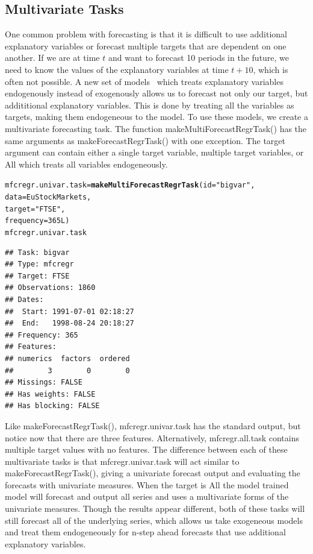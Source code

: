 \documentclass[12pt]{article}\usepackage[]{graphicx}\usepackage[]{color}
\makeatletter
\newcommand{\hlnum}[1]{\textcolor[rgb]{0.686,0.059,0.569}{#1}}%
\newcommand{\hlstr}[1]{\textcolor[rgb]{0.192,0.494,0.8}{#1}}%
\newcommand{\hlstd}[1]{\textcolor[rgb]{0.345,0.345,0.345}{#1}}%
\newcommand{\hlkwb}[1]{\textcolor[rgb]{0.69,0.353,0.396}{#1}}%
\newcommand{\hlkwc}[1]{\textcolor[rgb]{0.333,0.667,0.333}{#1}}%
\newcommand{\hlkwd}[1]{\textcolor[rgb]{0.737,0.353,0.396}{\textbf{#1}}}%
\newenvironment{kframe}{%
 \def\at@end@of@kframe{}%
 \ifinner\ifhmode%
  \def\at@end@of@kframe{\end{minipage}}%
  \begin{minipage}{\columnwidth}%
 \fi\fi%
 \def\FrameCommand##1{\hskip\@totalleftmargin \hskip-\fboxsep
 \colorbox{shadecolor}{##1}\hskip-\fboxsep
     \hskip-\linewidth \hskip-\@totalleftmargin \hskip\columnwidth}%
 \MakeFramed {\advance\hsize-\width
   \@totalleftmargin\z@ \linewidth\hsize
   \@setminipage}}%
 {\par\unskip\endMakeFramed%
 \at@end@of@kframe}
\newenvironment{knitrout}{}{} %
\theoremstyle{definition}
\newcommand\code{\@codex}
\def\@codex#1{{\normalfont\ttfamily\hyphenchar\font=-1 #1}}
\makeatother
\begin{document}
\subsection{Multivariate Tasks}
\label{sec:multivarTask}
One common problem with forecasting is that it is difficult to use additional explanatory variables or forecast multiple targets that are dependent on one another. If we are at time $t$ and want to forecast 10 periods in the future, we need to know the values of the explanatory variables at time $t+10$, which is often not possible. A new set of models~\cite{BigVAR} which treats explanatory variables endogenously instead of exogenously allows us to forecast not only our target, but addititional explanatory variables. This is done by treating all the variables as targets, making them endogeneous to the model. To use these models, we create a multivariate forecasting task. The function \code{makeMultiForecastRegrTask()} has the same arguments as \code{makeForecastRegrTask()} with one exception. The \code{target} argument can contain either a single target variable, multiple target variables, or \code{All} which treats all variables endogeneously.
\singlespacing
\begin{knitrout}
\color{fgcolor}\begin{kframe}
\begin{alltt}
\hlstd{mfcregr.univar.task} \hlkwb{=} \hlkwd{makeMultiForecastRegrTask}\hlstd{(}\hlkwc{id} \hlstd{=} \hlstr{"bigvar"}\hlstd{,}
                                                \hlkwc{data} \hlstd{= EuStockMarkets,}
                                                \hlkwc{target} \hlstd{=} \hlstr{"FTSE"}\hlstd{,}
                                                \hlkwc{frequency} \hlstd{=} \hlnum{365L}\hlstd{)}
\hlstd{mfcregr.univar.task}
\end{alltt}
\begin{verbatim}
## Task: bigvar
## Type: mfcregr
## Target: FTSE
## Observations: 1860
## Dates:
##  Start: 1991-07-01 02:18:27 
##  End:   1998-08-24 20:18:27
## Frequency: 365
## Features:
## numerics  factors  ordered 
##        3        0        0 
## Missings: FALSE
## Has weights: FALSE
## Has blocking: FALSE
\end{verbatim}
\end{kframe}
\end{knitrout}
\doublespacing

Like \code{makeForecastRegrTask()}, \code{mfcregr.univar.task} has the standard output, but notice now that there are three features. Alternatively, \code{mfcregr.all.task} contains multiple target values with no features. The difference between each of these multivariate tasks is that \code{mfcregr.univar.task} will act similar to \code{makeForecastRegrTask()}, giving a univariate forecast output and evaluating the forecasts with univariate measures. When the target is \code{All} the model trained model will forecast and output all series and uses a multivariate forms of the univariate measures. Though the results appear different, both of these tasks will still forecast all of the underlying series, which allows us take exogeneous models and treat them endogeneously for n-step ahead forecasts that use additional explanatory variables.
\end{document}
